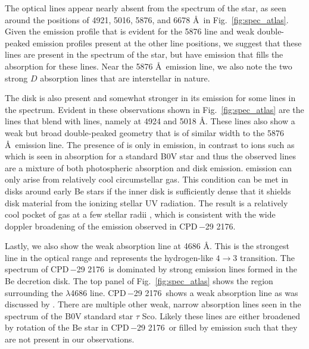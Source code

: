 \documentclass[]{aastex631}
\newcommand{\target}{CPD\,$-$29 2176}
\begin{document}
The optical  lines appear nearly absent from the spectrum of the star, as seen around the positions of 4921, 5016, 5876, and 6678 \AA\ in Fig.~\ref{fig:spec_atlas}. Given the emission profile that is evident for the 5876 line and weak double-peaked emission profiles present at the other  line positions, we suggest that these lines are present in the spectrum of the star, but have emission that fills the absorption for these lines. Near the  5876 \AA\ emission line, we also note the two strong  $D$ absorption lines that are interstellar in nature.

The disk is also present and somewhat stronger in its emission for some  lines in the spectrum. Evident in these observations shown in Fig.~\ref{fig:spec_atlas} are the  lines that blend with  lines, namely at 4924 and 5018 \AA. These lines also show a weak but broad double-peaked geometry that is of similar width to the  5876 \AA\ emission line. The presence of  is only in emission, in contrast to ions such as  which is seen in absorption for a standard B0V star and thus the observed  lines are a mixture of both photospheric absorption and disk emission. 
 emission can only arise from relatively cool circumstellar gas. This condition can be met in disks around early Be stars if the inner disk is sufficiently dense that it shields disk material from the ionizing stellar UV radiation. The result is a relatively cool pocket of gas at a few stellar radii \citep[e.g., Fig. 9 in ][]{2021ApJ...912...76M}, which is consistent with the wide doppler broadening of the  emission observed in \target.



Lastly, we also show the weak  absorption line at 4686 \AA. This is the strongest  line in the optical range and represents the hydrogen-like $4\rightarrow 3$ transition. 
The spectrum of \target\ is dominated by strong emission lines formed in the Be decretion disk. The top panel of Fig.~\ref{fig:spec_atlas} shows the region surrounding the  $\lambda$4686 line. \target\ shows a weak absorption line as was discussed by \citet{noel}. There are multiple other weak, narrow absorption lines seen in the spectrum of the B0V standard star $\tau$ Sco. Likely these lines are either broadened by rotation of the Be star in \target\ or filled by emission such that they are not present in our observations. 
\end{document}

